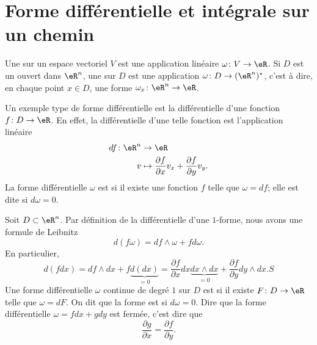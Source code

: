 \section{Forme différentielle et intégrale sur un chemin}
\label{SecFormDiffRappel}

Une  sur un espace vectoriel $V$ est une application linéaire $\omega\colon V\to \eR$. Si $D$ est un ouvert dans $\eR^n$, une  sur $D$ est une application $\omega\colon D\to (\eR^n)^*$, c'est à dire, en chaque point $x\in D$, une forme $\omega_x\colon \eR^n\to \eR$.

Un exemple type de forme différentielle est la différentielle d'une fonction $f\colon D\to \eR$. En effet, la différentielle d'une telle fonction est l'application linéaire
\begin{equation}
    \begin{aligned}
        df\colon \eR^n&\to \eR \\
        v&\mapsto \frac{ \partial f }{ \partial x }v_x+\frac{ \partial f }{ \partial y }v_y. 
    \end{aligned}
\end{equation}
La forme différentielle $\omega$ est  si il existe une fonction $f$ telle que $\omega=df$; elle est dite  si $d\omega=0$.

Soit $D\subset\eR^n$. Par définition de la différentielle d'une $1$-forme, nous avons une formule de Leibnitz
\begin{equation}
    d(f\omega)=df\wedge\omega+fd\omega.
\end{equation}
En particulier,
\begin{equation}
    d(fdx)=df\wedge dx+f\underbrace{d(dx)}_{=0}=\frac{ \partial f }{ \partial x }dx\underbrace{dx\wedge dx}_{=0}+\frac{ \partial f }{ \partial y }dy\wedge dx. S
\end{equation}
Une forme différentielle $\omega$ continue de degré $1$ sur $D$ est  si il existe $F\colon D\to \eR$ telle que $\omega=dF$. On dit que la forme est  si $d\omega=0$. Dire que la forme différentielle $\omega=fdx+gdy$ est fermée, c'est dire que
\begin{equation}
    \frac{ \partial g }{ \partial x }=\frac{ \partial f }{ \partial y }.
\end{equation}

